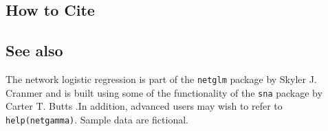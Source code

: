  \subsection* {How to Cite} 



\subsection* {See also}
The network logistic regression is part of the {\tt netglm} package by Skyler J. Cranmer and is built using some of the functionality of the  {\tt sna} package by Carter T. Butts \citep{ButCar01}.In addition, advanced users may wish to refer to {\tt help(netgamma)}. Sample data are fictional. 
